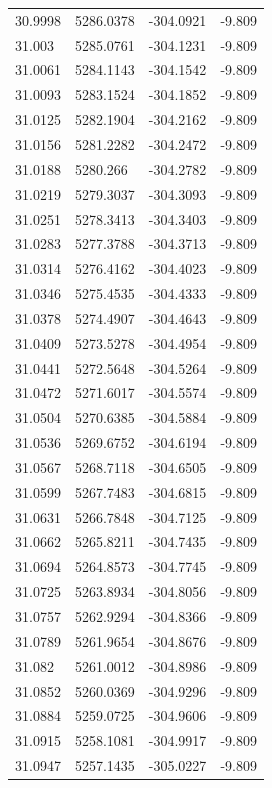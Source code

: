 \begin{table}[H]
\begin{tabular}{llll}
30.9998 & 5286.0378 & -304.0921 & -9.809 \\
31.003 & 5285.0761 & -304.1231 & -9.809 \\
31.0061 & 5284.1143 & -304.1542 & -9.809 \\
31.0093 & 5283.1524 & -304.1852 & -9.809 \\
31.0125 & 5282.1904 & -304.2162 & -9.809 \\
31.0156 & 5281.2282 & -304.2472 & -9.809 \\
31.0188 & 5280.266 & -304.2782 & -9.809 \\
31.0219 & 5279.3037 & -304.3093 & -9.809 \\
31.0251 & 5278.3413 & -304.3403 & -9.809 \\
31.0283 & 5277.3788 & -304.3713 & -9.809 \\
31.0314 & 5276.4162 & -304.4023 & -9.809 \\
31.0346 & 5275.4535 & -304.4333 & -9.809 \\
31.0378 & 5274.4907 & -304.4643 & -9.809 \\
31.0409 & 5273.5278 & -304.4954 & -9.809 \\
31.0441 & 5272.5648 & -304.5264 & -9.809 \\
31.0472 & 5271.6017 & -304.5574 & -9.809 \\
31.0504 & 5270.6385 & -304.5884 & -9.809 \\
31.0536 & 5269.6752 & -304.6194 & -9.809 \\
31.0567 & 5268.7118 & -304.6505 & -9.809 \\
31.0599 & 5267.7483 & -304.6815 & -9.809 \\
31.0631 & 5266.7848 & -304.7125 & -9.809 \\
31.0662 & 5265.8211 & -304.7435 & -9.809 \\
31.0694 & 5264.8573 & -304.7745 & -9.809 \\
31.0725 & 5263.8934 & -304.8056 & -9.809 \\
31.0757 & 5262.9294 & -304.8366 & -9.809 \\
31.0789 & 5261.9654 & -304.8676 & -9.809 \\
31.082 & 5261.0012 & -304.8986 & -9.809 \\
31.0852 & 5260.0369 & -304.9296 & -9.809 \\
31.0884 & 5259.0725 & -304.9606 & -9.809 \\
31.0915 & 5258.1081 & -304.9917 & -9.809 \\
31.0947 & 5257.1435 & -305.0227 & -9.809 \\

\end{tabular}
\end{table}
